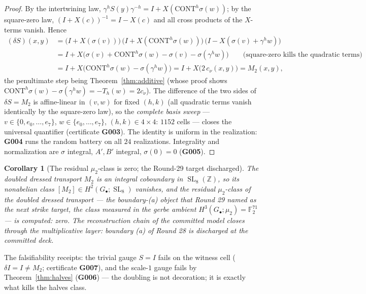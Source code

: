 \documentclass[11pt]{article}
\newcommand{\Z}{\mathbb Z}
\newcommand{\F}{\mathbb F}
\newcommand{\SL}{\operatorname{SL}}
\newtheorem{corollary}[theorem]{Corollary}
\begin{document}
\begin{proof}
By the intertwining law,
$\gamma^hS(y)\gamma^{-h}=I+X(\mathrm{CONT}^h\sigma(w))$; by the
square-zero law, $(I+X(c))^{-1}=I-X(c)$ and all cross products of the
$X$-terms vanish. Hence
\begin{align*}
(\delta S)(x,y)
&=\bigl(I+X(\sigma(v))\bigr)\,
   \bigl(I+X(\mathrm{CONT}^h\sigma(w))\bigr)\,
   \bigl(I-X(\sigma(v)+\gamma^hw)\bigr)\\
&=I+X\bigl(\sigma(v)+\mathrm{CONT}^h\sigma(w)-\sigma(v)-\sigma(\gamma^hw)\bigr)
\qquad\text{(square-zero kills the quadratic terms)}\\
&=I+X\bigl(\mathrm{CONT}^h\sigma(w)-\sigma(\gamma^hw)\bigr)
=I+X\bigl(2\,c_\nu(x,y)\bigr)=M_2(x,y),
\end{align*}
the penultimate step being Theorem~\ref{thm:additive} (whose proof
shows $\mathrm{CONT}^h\sigma(w)-\sigma(\gamma^hw)=-T_h(w)=2c_\nu$).
The difference of the two sides of $\delta S=M_2$ is affine-linear in
$(v,w)$ for fixed $(h,k)$ (all quadratic terms vanish identically by
the square-zero law), so the \emph{complete basis sweep} --- $v\in\{0,
e_0,\dots,e_7\}$, $w\in\{e_0,\dots,e_7\}$, $(h,k)\in4\times4$:
$1152$ cells --- closes the universal quantifier (certificate
\textbf{G003}). The identity is uniform in the realization:
\textbf{G004} runs the random battery on all $24$ realizations.
Integrality and normalization are
$\sigma$ integral, $A',B'$ integral, $\sigma(0)=0$
(\textbf{G005}).
\end{proof}

\begin{corollary}[The residual $\mu_2$-class is zero; the Round-29
target discharged]\label{cor:residual-zero}
The doubled dressed transport $M_2$ is an integral coboundary in
$\SL_8(\Z)$, so its nonabelian class
$[M_2]\in H^2(G_\bullet;\SL_8)$ vanishes, and the residual
$\mu_2$-class of the doubled dressed transport --- the boundary-(a)
object that Round 29 named as the next strike target, the class
measured in the gerbe ambient $H^3(G_\bullet;\mu_2)=\F_2^{71}$ --- is
\emph{computed: zero}. The reconstruction
chain of the committed model closes through the multiplicative layer:
boundary (a) of Round 28 is discharged at the committed deck.
\end{corollary}

The falsifiability receipts: the trivial gauge $S=I$ fails on the
witness cell ($\delta I=I\ne M_2$; certificate \textbf{G007}), and the
scale-$1$ gauge fails by Theorem~\ref{thm:halves} (\textbf{G006}) ---
the doubling is not decoration; it is exactly what kills the halves
class.
\end{document}
